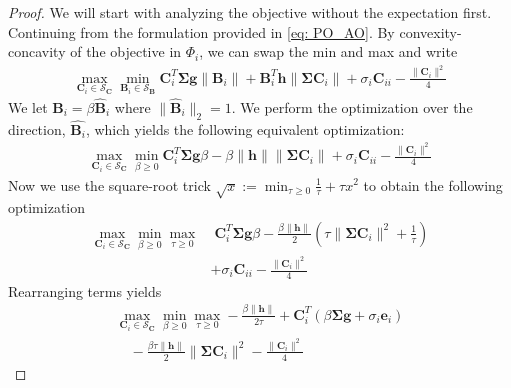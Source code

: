 \documentclass[conference]{IEEEtran}
\newcommand{\bB}{\mathbf{B}}
\newcommand{\bC}{\mathbf{C}}
\newcommand{\calS}{\mathcal{S}}
\begin{document}
\begin{proof}
We will start with analyzing the objective without the expectation first. Continuing from the formulation provided in \eqref{eq: PO_AO}. By convexity-concavity of the objective in $\Phi_i$, we can swap the min and max and write
\begin{align*}
    \max_{\mathbf{C}_i \in \calS_{\bC}} \min_{\mathbf{B}_i \in \calS_{\bB}}  \mathbf{C}_i^T \boldsymbol{\Sigma} \mathbf{g} \|\mathbf{B}_i\| + \mathbf{B}_i^T \mathbf{h} \|\boldsymbol{\Sigma}\mathbf{C}_i\| + \sigma_i\mathbf{C}_{ii}- \frac{\|\mathbf{C}_i\|^2}{4}
\end{align*}
We let $\bB_i = \beta \hat{\bB}_i$ where $\|\hat{\bB}_i\|_2 = 1$. We perform the optimization over the direction, $\hat{\bB_i}$, which yields the following equivalent optimization:
\begin{align*}
     \max_{\mathbf{C}_i \in \calS_{\bC}} \min_{\beta \ge 0} \mathbf{C}_i^T \boldsymbol{\Sigma} \mathbf{g} \beta - \beta \|\mathbf{h}\| \|\boldsymbol{\Sigma}\mathbf{C}_i\| + \sigma_i\mathbf{C}_{ii}- \frac{\|\mathbf{C}_i\|^2}{4} 
\end{align*}
Now we use the square-root trick $\sqrt{x}:= \min_{\tau \ge 0} \frac{1}{\tau} + \tau x^2$ to obtain the following optimization
\begin{align*}
     \max_{\mathbf{C}_i \in \calS_{\bC}} \min_{\beta \ge 0} \max_{\tau \ge 0} & \;\mathbf{C}_i^T \boldsymbol{\Sigma} \mathbf{g} \beta - \frac{\beta  \|\mathbf{h}\|}{2} \left(\tau\|\boldsymbol{\Sigma}\mathbf{C}_i\|^2 + \frac{1}{\tau}\right) \\ &+ \sigma_i\mathbf{C}_{ii}- \frac{\|\mathbf{C}_i\|^2}{4}
\end{align*}
Rearranging terms yields
\begin{align}
    \max_{\mathbf{C}_i \in \calS_{\bC}}  \min_{\beta \ge 0} \max_{\tau \ge 0} - \frac{\beta\|\mathbf{h}\|}{2\tau} + \mathbf{C}_i^T \left(\beta \boldsymbol{\Sigma} \mathbf{g} + \sigma_i\mathbf{e}_i\right) \nonumber \\
    \quad - \frac{\beta\tau  \|\mathbf{h}\|}{2} \|\boldsymbol{\Sigma}\mathbf{C}_i\|^2 - \frac{\|\mathbf{C}_i\|^2}{4} \label{opt: scal_not}
\end{align}


\end{proof}
\end{document}

